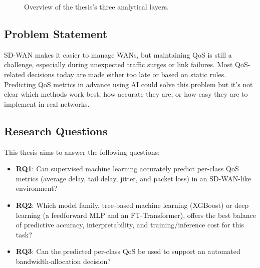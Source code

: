 \documentclass[a4paper,12pt]{Classes/RoboticsLaTeX}
\begin{document}
    \begin{figure}[H]
    \centering
    \caption[The three-layer thesis architecture]{Overview of the thesis's three analytical layers.}
    \label{fig:architecture}
    \end{figure}
    
    \subsection*{Problem Statement}
    
    SD-WAN makes it easier to manage WANs, but maintaining QoS is still a challenge, especially during unexpected traffic surges or link failures. Most QoS-related decisions today are made either too late or based on static rules. Predicting QoS metrics in advance using AI could solve this problem but it’s not clear which methods work best, how accurate they are, or how easy they are to implement in real networks.
    
    \subsection*{Research Questions}
    
    This thesis aims to answer the following questions:
    \begin{itemize}
        \item \textbf{RQ1}: Can supervised machine learning accurately predict per-class QoS metrics (average delay, tail delay, jitter, and packet loss) in an SD-WAN-like environment?
        \item \textbf{RQ2}: Which model family, tree-based machine learning (XGBoost) or deep learning (a feedforward MLP and an FT-Transformer), offers the best balance of predictive accuracy, interpretability, and training/inference cost for this task?
        \item \textbf{RQ3}: Can the predicted per-class QoS be used to support an automated bandwidth-allocation decision?
    \end{itemize}
\end{document}
